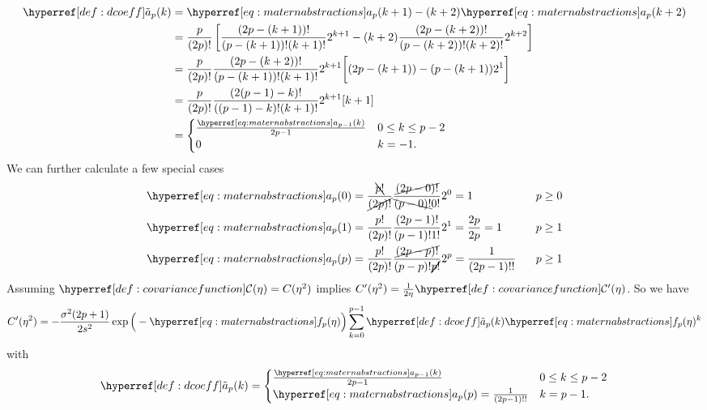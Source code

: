 \begin{align}
	\nonumber
	\dcoeff(k)
	&= \mcoeff(k+1) - (k+2)\mcoeff(k+2)\\
	\nonumber
	&= \frac{p}{(2p)!}\left[
		\frac{(2p-(k+1))!}{(p-(k+1))!(k+1)!}2^{k+1}
		- (k+2)\frac{(2p-(k+2))!}{(p-(k+2))!(k+2)!}2^{k+2}
	\right]\\
	\nonumber
	&= \frac{p}{(2p)!}\frac{(2p - (k+2))!}{(p-(k+1))!(k+1)!}2^{k+1}
	\bigg[(2p-(k+1))- (p-(k+1))2^1\bigg]\\
	\nonumber
	&= \frac{p}{(2p)!}\frac{(2(p-1) -k)!}{((p-1)-k)!(k+1)!}2^{k+1}[k+1]\\
	\label{eq: dcoeff(k)}
	&= \begin{cases}
		\frac{\mcoeff[p-1](k)}{2p-1} & 0 \le k \le p-2\\
		0 & k=-1.
	\end{cases}
\end{align}
We can further calculate a few special cases
\begin{align}
	\label{eq: mcoeff 0}
	\mcoeff(0)
	&= \frac{\bcancel{p!}}{\cancel{(2p)!}}\frac{\cancel{(2p-0)!}}{\bcancel{(p-0)!}0!}2^0
	= 1
	\qquad
	&& p\ge 0\\
	\label{eq: mcoeff 1}
	\mcoeff(1)
	&= \frac{p!}{(2p)!}\frac{(2p-1)!}{(p-1)!1!}2^1 = \frac{2p}{2p} = 1 
	\qquad
	&& p\ge 1\\
	\mcoeff(p)
	\label{eq: mcoeff p}
	&= \frac{p!}{(2p)!}\frac{\cancel{(2p-p)!}}{(p-p)!\cancel{p!}}2^p
	= \frac{1}{(2p-1)!!}
	&& p \ge 1
\end{align}
%
Assuming \(\C(\lr) = \sqC(\lr^2)\) implies \(\sqC'(\lr^2) = \frac1{2\lr}\C'(\lr)\).
So we have
\begin{equation*}
	\sqC'(\lr^2)
	=-\frac{\sigma^2(2p+1)}{2s^2}
	\exp\Big(-\mf(\lr)\Big)\sum_{k=0}^{p-1} \dcoeff(k)\mf(\lr)^k
\end{equation*}
with
\begin{equation*}
	\dcoeff(k) = \begin{cases}
		\frac{\mcoeff[p-1](k)}{2p-1} & 0 \le k \le p-2\\
		\mcoeff(p) = \frac{1}{(2p-1)!!} & k=p-1.
	\end{cases}
\end{equation*}

